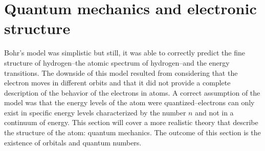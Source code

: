 \documentclass[main.tex]{subfiles}
\begin{document}
\newpage
\section{Quantum mechanics and electronic structure}
Bohr's model was simplistic but still, it was able to correctly predict the fine structure of hydrogen--the atomic spectrum of hydrogen--and the energy transitions. The downside of this model resulted from considering that the electron moves in different orbits and that it did not provide a complete description of the behavior of the electrons in atoms. A correct assumption of the model was that the energy levels of the atom were quantized--electrons can only exist in specific energy levels characterized by the number $n$ and not in a continuum of energy. This section will cover a more realistic theory that describe the structure of the atom: quantum mechanics. The outcome of this section is the existence of orbitals and quantum numbers.
\end{document}
